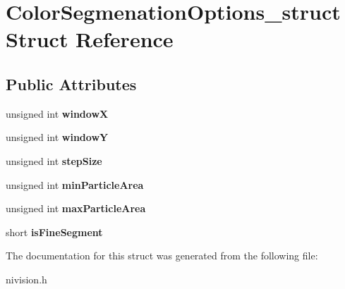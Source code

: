 \hypertarget{structColorSegmenationOptions__struct}{
\section{ColorSegmenationOptions\_\-struct Struct Reference}
\label{structColorSegmenationOptions__struct}
}
\subsection*{Public Attributes}
\begin{DoxyCompactItemize}
\item 
\hypertarget{structColorSegmenationOptions__struct_a16da55a8e7d081070341b9014f949584}{
unsigned int {\bfseries windowX}}
\label{structColorSegmenationOptions__struct_a16da55a8e7d081070341b9014f949584}

\item 
\hypertarget{structColorSegmenationOptions__struct_ab9ae7d0ad8a2e37e03d6fd1055c1fb01}{
unsigned int {\bfseries windowY}}
\label{structColorSegmenationOptions__struct_ab9ae7d0ad8a2e37e03d6fd1055c1fb01}

\item 
\hypertarget{structColorSegmenationOptions__struct_a19485b559c05075b18cb3a4f5b43f64b}{
unsigned int {\bfseries stepSize}}
\label{structColorSegmenationOptions__struct_a19485b559c05075b18cb3a4f5b43f64b}

\item 
\hypertarget{structColorSegmenationOptions__struct_a52e4abb70e2ddbf214b4b1693f106ced}{
unsigned int {\bfseries minParticleArea}}
\label{structColorSegmenationOptions__struct_a52e4abb70e2ddbf214b4b1693f106ced}

\item 
\hypertarget{structColorSegmenationOptions__struct_a0c84a60274909b8cffb25ea9c12a2028}{
unsigned int {\bfseries maxParticleArea}}
\label{structColorSegmenationOptions__struct_a0c84a60274909b8cffb25ea9c12a2028}

\item 
\hypertarget{structColorSegmenationOptions__struct_a68a930ea73e438a7d7b435a27d0539e8}{
short {\bfseries isFineSegment}}
\label{structColorSegmenationOptions__struct_a68a930ea73e438a7d7b435a27d0539e8}

\end{DoxyCompactItemize}


The documentation for this struct was generated from the following file:\begin{DoxyCompactItemize}
\item 
nivision.h\end{DoxyCompactItemize}
